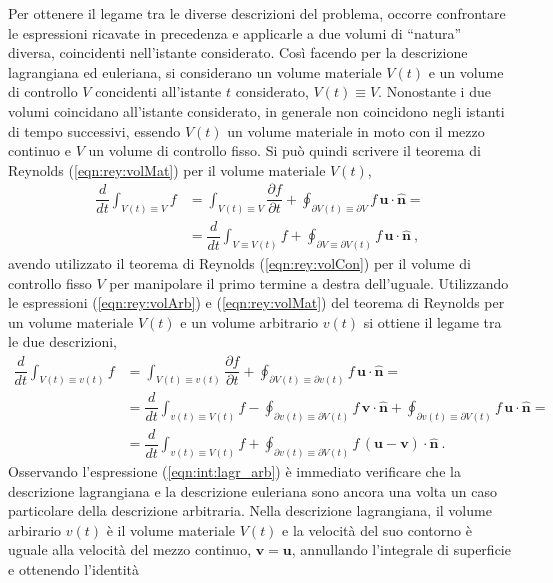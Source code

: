 Per ottenere il legame tra le diverse descrizioni del problema, occorre confrontare le espressioni ricavate in precedenza e applicarle a due volumi di ``natura'' diversa, coincidenti nell'istante considerato. Così facendo per la descrizione lagrangiana ed euleriana, si considerano un volume materiale $V(t)$ e un volume di controllo $V$ concidenti all'istante $t$ considerato, $V(t) \equiv V$. Nonostante i due volumi coincidano all'istante considerato, in generale non coincidono negli istanti di tempo successivi, essendo $V(t)$ un volume materiale in moto con il mezzo continuo e $V$ un volume di controllo fisso.
Si può quindi scrivere il teorema di Reynolds (\ref{eqn:rey:volMat}) per il volume materiale $V(t)$,
\begin{equation}\label{eqn:int:lagr_eul}
\begin{aligned}
    \dfrac{d}{dt} \int_{V(t)\equiv V} f & = \int_{V(t)\equiv V} \dfrac{\partial f}{\partial t} +
     \oint_{\partial V(t)\equiv \partial V} f \, \bm{u} \cdot \bm{\hat{n}} = \\
     & = \dfrac{d}{dt} \int_{V \equiv V(t)} f +
     \oint_{\partial V\equiv \partial V(t)} f \, \bm{u} \cdot \bm{\hat{n}} \ ,
\end{aligned}
\end{equation}
avendo utilizzato il teorema di Reynolds (\ref{eqn:rey:volCon}) per il volume di controllo fisso $V$ per manipolare il primo termine a destra dell'uguale. Utilizzando le espressioni (\ref{eqn:rey:volArb}) e (\ref{eqn:rey:volMat}) del teorema di Reynolds per un volume materiale $V(t)$ e un volume arbitrario $v(t)$ si ottiene il legame tra le due descrizioni,
\begin{equation}\label{eqn:int:lagr_arb}
\begin{aligned}
    \dfrac{d}{dt} \int_{V(t)\equiv v(t)} f & = \int_{V(t)\equiv v(t)} \dfrac{\partial f}{\partial t} +
      \oint_{\partial V(t)\equiv \partial v(t)} f \, \bm{u} \cdot \bm{\hat{n}} = \\
      & = \dfrac{d}{dt} \int_{v(t) \equiv V(t)} f 
   - \oint_{\partial v(t) \equiv \partial V(t)} f \, \bm{v} \cdot \bm{\hat{n}}
   + \oint_{\partial v(t) \equiv \partial V(t)} f \, \bm{u} \cdot \bm{\hat{n}} = \\
      & = \dfrac{d}{dt} \int_{v(t) \equiv V(t)} f +
     \oint_{\partial v(t) \equiv \partial V(t)} f \, (\bm{u}-\bm{v}) \cdot \bm{\hat{n}} \ .
\end{aligned}
\end{equation}
Osservando l'espressione (\ref{eqn:int:lagr_arb}) è immediato verificare che la descrizione lagrangiana e la descrizione euleriana sono ancora una volta un caso particolare della descrizione arbitraria. Nella descrizione lagrangiana, il volume arbirario $v(t)$ è il volume materiale $V(t)$ e la velocità del suo contorno è uguale alla velocità del mezzo continuo, $\bm{v} = \bm{u}$, annullando l'integrale di superficie e ottenendo l'identità
